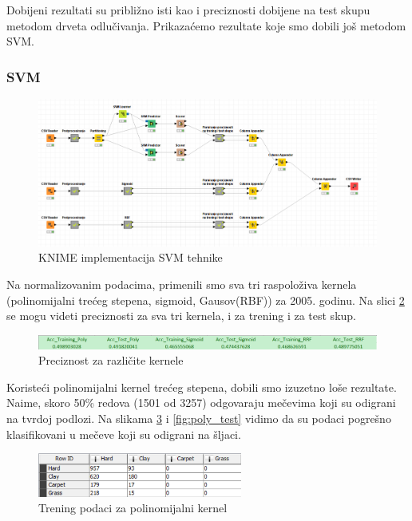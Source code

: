 \documentclass[a4paper]{article}
\begin{document}
Dobijeni rezultati su približno isti kao i preciznosti dobijene na test skupu metodom drveta odlučivanja. Prikazaćemo rezultate koje smo dobili još metodom SVM.

\subsubsection{SVM}

\begin{figure}[H]
	\begin{center}
		\includegraphics[width=1\textwidth]{Klasifikacija/SVM/SVM_knime}
	\end{center}
	\caption{KNIME implementacija SVM tehnike}
	\label{fig:KNIME_CvoroviKlasifikacija}
\end{figure}

Na normalizovanim podacima, primenili smo sva tri raspoloživa kernela (polinomijalni trećeg stepena, sigmoid, Gausov(RBF)) za 2005. godinu.
Na slici \ref{fig:precision} se mogu videti preciznosti za sva tri kernela, i za trening i za test skup.

\begin{figure}[H]
	\begin{center}
		\includegraphics[width=1\textwidth]{Klasifikacija/SVM/preciznostSlika.png}
	\end{center}
	\caption{Preciznost za različite kernele}
	\label{fig:precision}
\end{figure}


Koristeći polinomijalni kernel trećeg stepena, dobili smo izuzetno loše rezultate.
Naime, skoro 50\% redova (1501 od 3257) odgovaraju mečevima koji su odigrani na tvrdoj podlozi.
Na slikama \ref{fig:poly_training} i \ref{fig:poly_test} vidimo da su podaci pogrešno klasifikovani u
mečeve koji su odigrani na šljaci.

\begin{figure}[H]
	\begin{center}
		\includegraphics[width=0.6\textwidth]{Klasifikacija/SVM/poly_training}
	\end{center}
	\caption{Trening podaci za polinomijalni kernel}
	\label{fig:poly_training}
\end{figure}
\end{document}
